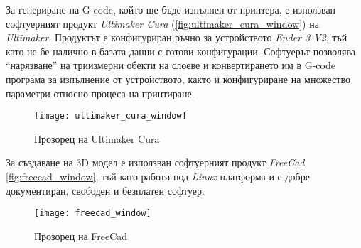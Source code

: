 \FloatBarrier
За генериране на G-code, който ще бъде изпълнен от принтера, е използван софтуерният продукт
\textit{Ultimaker Cura} (\autoref{fig:ultimaker_cura_window}) на \textit{Ultimaker}.
Продуктът е конфигуриран ръчно за устройството \textit{Ender 3 V2}, тъй като не бе налично
в базата данни с готови конфигурации. 
Софтуерът позволява \enquote{нарязване} на триизмерни обекти на слоеве и конвертирането им в G-code програма за изпълнение от
устройството, както и конфигуриране на множество параметри относно процеса на принтиране.

\begin{figure}[htpb!]
    \centering
    \texttt{[image: ultimaker\_cura\_window]}
    \caption{Прозорец на Ultimaker Cura}
    \label{fig:ultimaker_cura_window}
\end{figure}
\FloatBarrier
За създаване на 3D модел е използван софтуерният продукт \textit{FreeCad} \autoref{fig:freecad_window},
тъй като работи под \textit{Linux} платформа и е добре документиран, свободен и безплатен софтуер.

\begin{figure}[htpb!]
    \centering
    \texttt{[image: freecad\_window]}
    \caption{Прозорец на FreeCad}
    \label{fig:freecad_window}
\end{figure}

\FloatBarrier




